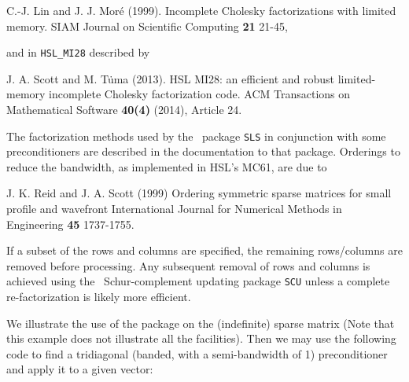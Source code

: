 \documentclass{galahad}
\begin{document}
\noindent
C.-J. Lin and J. J. Mor\'{e} (1999).
Incomplete Cholesky factorizations with limited memory.
SIAM Journal on Scientific Computing {\bf 21} 21-45,

\noindent
and in {\tt HSL\_MI28} described by
\vspace*{1mm}

\noindent
J. A. Scott and M. T\.{u}ma (2013). HSL MI28: an efficient and robust 
limited-memory incomplete Cholesky factorization code. 
ACM Transactions on Mathematical Software {\bf 40(4)} (2014), Article 24.

The factorization methods used by the \libraryname\ package {\tt SLS} in
conjunction with some preconditioners
are described in the documentation to that package. Orderings to reduce the
bandwidth, as implemented in HSL's MC61, are due to
\vspace*{1mm}

\noindent
J. K. Reid and J. A. Scott (1999)
Ordering symmetric sparse matrices for small profile and wavefront
International Journal for Numerical Methods in Engineering {\bf 45} 1737-1755.

If a subset of the rows and columns are specified, the remaining rows/columns
are removed before processing. Any subsequent removal of rows and columns
is achieved using the \libraryname\ Schur-complement updating package {\tt SCU}
unless a complete re-factorization is likely more efficient.


\galexample
We illustrate the use of the package on the (indefinite) sparse matrix
(Note that this example does not illustrate all the facilities).
Then we may use the following code to find a tridiagonal (banded, with a 
semi-bandwidth of 1) preconditioner and apply it to a given vector:
\end{document}

